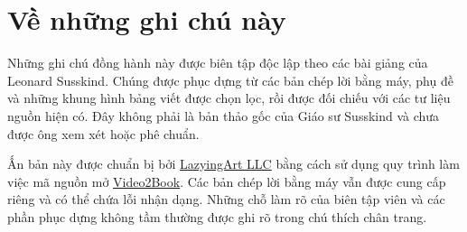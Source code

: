 \documentclass[11pt,oneside]{book}
\begin{document}
\frontmatter
\hypersetup{pageanchor=false}

\hypersetup{pageanchor=true}

\clearpage
\chapter*{Về những ghi chú này}
Những ghi chú đồng hành này được biên tập độc lập theo các bài giảng của Leonard Susskind. Chúng được phục dựng từ các bản chép lời bằng máy, phụ đề và những khung hình bảng viết được chọn lọc, rồi được đối chiếu với các tư liệu nguồn hiện có. Đây không phải là bản thảo gốc của Giáo sư Susskind và chưa được ông xem xét hoặc phê chuẩn.

Ấn bản này được chuẩn bị bởi \href{https://lazying.art}{LazyingArt LLC} bằng cách sử dụng quy trình làm việc mã nguồn mở \href{https://github.com/lachlanchen/Video2Book}{Video2Book}. Các bản chép lời bằng máy vẫn được cung cấp riêng và có thể chứa lỗi nhận dạng. Những chỗ làm rõ của biên tập viên và các phần phục dựng không tầm thường được ghi rõ trong chú thích chân trang.
\clearpage
\tableofcontents
\mainmatter








\end{document}
